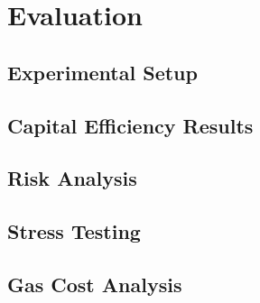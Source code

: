 \section{Evaluation}\label{sec:evaluation}


\subsection{Experimental Setup}

\subsection{Capital Efficiency Results}

\subsection{Risk Analysis}

\subsection{Stress Testing}

\subsection{Gas Cost Analysis}
